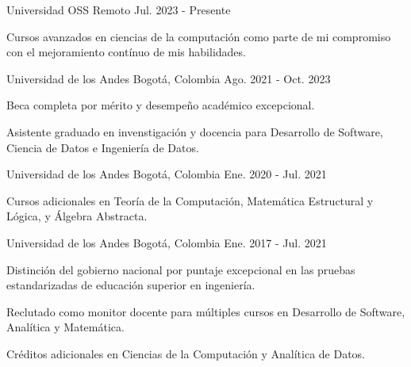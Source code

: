 

\begin{cventries}

	{Universidad OSS} %
	{Remoto} %
	{Jul. 2023 {-} Presente} %
	{
		\begin{cvitems} %
			\item {Cursos avanzados en ciencias de la computación como parte de mi compromiso con el mejoramiento contínuo de mis habilidades.}
		\end{cvitems}
	}

	{Universidad de los Andes} %
	{Bogotá, Colombia} %
	{Ago. 2021 {-} Oct. 2023} %
	{
		\begin{cvitems} %
			\item {Beca completa por mérito y desempeño académico excepcional.}
			\item {Asistente graduado en invenstigación y docencia para Desarrollo de Software, Ciencia de Datos e Ingeniería de Datos.}
		\end{cvitems}
	}

	{Universidad de los Andes} %
	{Bogotá, Colombia} %
	{Ene. 2020 {-} Jul. 2021} %
	{
		\begin{cvitems} %
			\item {Cursos adicionales en Teoría de la Computación, Matemática Estructural y Lógica, y Álgebra Abstracta.}
		\end{cvitems}
	}

	{Universidad de los Andes} %
	{Bogotá, Colombia} %
	{Ene. 2017 {-} Jul. 2021} %
	{
		\begin{cvitems} %
			\item {Distinción del gobierno nacional por puntaje excepcional en las pruebas estandarizadas de educación superior en ingeniería.}
			\item {Reclutado como monitor docente para múltiples cursos en Desarrollo de Software, Analítica y Matemática.}
			\item {Créditos adicionales en Ciencias de la Computación y Analítica de Datos.}
		\end{cvitems}
	}

\end{cventries}
